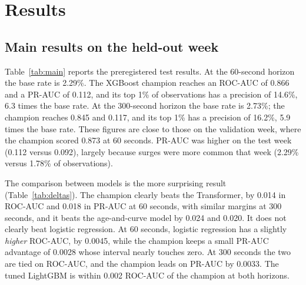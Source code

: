 \section{Results}
\label{sec:results}

\subsection{Main results on the held-out week}

Table~\ref{tab:main} reports the preregistered test results. At the 60-second horizon the base rate is 2.29\%. The XGBoost champion reaches an ROC-AUC of 0.866 and a PR-AUC of 0.112, and its top 1\% of observations has a precision of 14.6\%, 6.3 times the base rate. At the 300-second horizon the base rate is 2.73\%; the champion reaches 0.845 and 0.117, and its top 1\% has a precision of 16.2\%, 5.9 times the base rate. These figures are close to those on the validation week, where the champion scored 0.873 at 60 seconds. PR-AUC was higher on the test week (0.112 versus 0.092), largely because surges were more common that week (2.29\% versus 1.78\% of observations).

\begin{table}[t]
\centering
\caption{Preregistered test-week results. P@$k$ is the precision among the top $k$ of observations by score. The last column gives validation-week ROC-AUC and PR-AUC for reference. Bold marks the best value in a column within each horizon.}
\label{tab:main}
\tabsize
\setlength{\tabcolsep}{4pt}

\end{table}

The comparison between models is the more surprising result (Table~\ref{tab:deltas}). The champion clearly beats the Transformer, by 0.014 in ROC-AUC and 0.018 in PR-AUC at 60 seconds, with similar margins at 300 seconds, and it beats the age-and-curve model by 0.024 and 0.020. It does not clearly beat logistic regression. At 60 seconds, logistic regression has a slightly \emph{higher} ROC-AUC, by 0.0045, while the champion keeps a small PR-AUC advantage of 0.0028 whose interval nearly touches zero. At 300 seconds the two are tied on ROC-AUC, and the champion leads on PR-AUC by 0.0033. The tuned LightGBM is within 0.002 ROC-AUC of the champion at both horizons.

\begin{table}[t]
\centering
\caption{Paired differences on the test week (champion minus each model), with 95\% confidence intervals from a token-clustered bootstrap (2,000 replicates).}
\label{tab:deltas}
\tabsize

\end{table}

